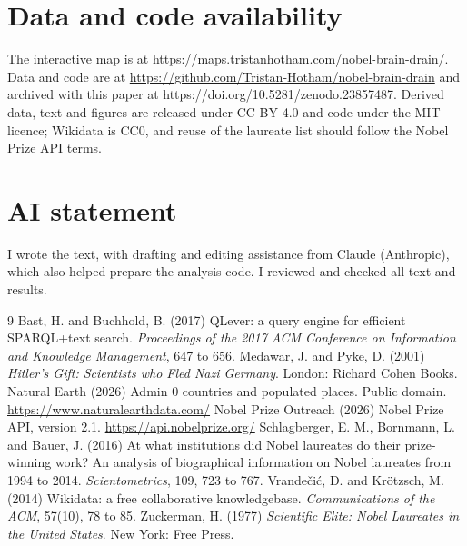 \documentclass[11pt,a4paper]{article}
\begin{document}
\section*{Data and code availability}
The interactive map is at \url{https://maps.tristanhotham.com/nobel-brain-drain/}. Data and code are at \url{https://github.com/Tristan-Hotham/nobel-brain-drain} and archived with this paper at https://doi.org/10.5281/zenodo.23857487. Derived data, text and figures are released under CC BY 4.0 and code under the MIT licence; Wikidata is CC0, and reuse of the laureate list should follow the Nobel Prize API terms.

\section*{AI statement}
I wrote the text, with drafting and editing assistance from Claude (Anthropic), which also helped prepare the analysis code. I reviewed and checked all text and results.

\begin{thebibliography}{9}
 Bast, H. and Buchhold, B. (2017) QLever: a query engine for efficient SPARQL+text search. \emph{Proceedings of the 2017 ACM Conference on Information and Knowledge Management}, 647 to 656.
 Medawar, J. and Pyke, D. (2001) \emph{Hitler's Gift: Scientists who Fled Nazi Germany}. London: Richard Cohen Books.
 Natural Earth (2026) Admin 0 countries and populated places. Public domain. \url{https://www.naturalearthdata.com/}
 Nobel Prize Outreach (2026) Nobel Prize API, version 2.1. \url{https://api.nobelprize.org/}
 Schlagberger, E. M., Bornmann, L. and Bauer, J. (2016) At what institutions did Nobel laureates do their prize-winning work? An analysis of biographical information on Nobel laureates from 1994 to 2014. \emph{Scientometrics}, 109, 723 to 767.
 Vrandečić, D. and Krötzsch, M. (2014) Wikidata: a free collaborative knowledgebase. \emph{Communications of the ACM}, 57(10), 78 to 85.
 Zuckerman, H. (1977) \emph{Scientific Elite: Nobel Laureates in the United States}. New York: Free Press.
\end{thebibliography}
\end{document}
